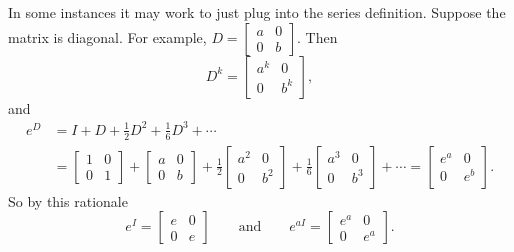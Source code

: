 \documentclass{ximera}
\begin{document}
In some instances it may work to just plug into the series definition. Suppose the matrix is diagonal. For example,
$D = \left[ \begin{smallmatrix} a & 0 \\ 0 & b \end{smallmatrix} \right]$.
Then 
\begin{equation*}
    D^k = \begin{bmatrix} a^k & 0 \\ 0 & b^k \end{bmatrix} ,
\end{equation*}
and
\begin{equation*}
    \begin{split}
        e^D & = I + D + \frac{1}{2} D^2 + \frac{1}{6} D^3 + \cdots \\
        &=
        \begin{bmatrix} 
            1 & 0 \\ 
            0 & 1 
        \end{bmatrix} +
        \begin{bmatrix} 
            a & 0 \\ 
            0 & b 
        \end{bmatrix}
         + \frac{1}{2}
        \begin{bmatrix} 
            a^2 & 0 \\ 
            0 & b^2 
        \end{bmatrix}
         + \frac{1}{6}
        \begin{bmatrix} 
            a^3 & 0 \\ 
            0 & b^3 
        \end{bmatrix} 
        + \cdots =
        \begin{bmatrix} 
            e^a & 0 \\ 
            0 & e^b 
        \end{bmatrix} .
    \end{split}
\end{equation*}
So by this rationale
\begin{equation*}
    e^I = 
    \begin{bmatrix} 
        e & 0\\ 
        0 & e 
    \end{bmatrix}
    \qquad \text{and} \qquad e^{aI} = 
    \begin{bmatrix} 
        e^a & 0\\ 
        0 & e^a 
    \end{bmatrix}.
\end{equation*}
\end{document}
